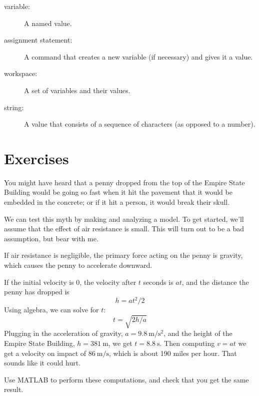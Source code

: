 \begin{description}
\item[variable:] A named value.

\item[assignment statement:] A command that creates a new variable
(if necessary) and gives it a value.

\item[workspace:] A set of variables and their values.

\item[string:] A value that consists of a sequence of characters (as
opposed to a number).


\end{description}


\section{Exercises}

\begin{ex}
\label{penny}
You might have heard that a penny dropped from the top of the Empire State Building would be going so fast when it hit the pavement that it would be embedded in the concrete; or if it hit a person, it would break their skull.


We can test this myth by making and analyzing a model.  To get started, we'll assume that the effect of air resistance is small.  This will turn out to be a bad assumption, but bear with me.

If air resistance is negligible, the primary force acting on the penny is gravity, which causes the penny to accelerate downward.


If the initial velocity is 0, the velocity after $t$ seconds is $a t$, and the distance the penny has dropped is
%
\[ h = a t^2 / 2 \]
%
Using algebra, we can solve for $t$:
%
\[ t = \sqrt{ 2 h / a} \]
%
Plugging in the acceleration of gravity, 
$a = \SI{9.8}{\meter\per\second\squared}$, and the height of the Empire State Building, 
$h = \SI{381}{\meter}$, we get 
$t = \SI{8.8}{\second}$.  
Then computing $v = a t$ we get a velocity on impact of $\SI{86}{\meter\per\second}$, which is about 190 miles per hour.  That sounds like it could hurt.

Use MATLAB to perform these computations, and check that you get the same result.
\end{ex}

